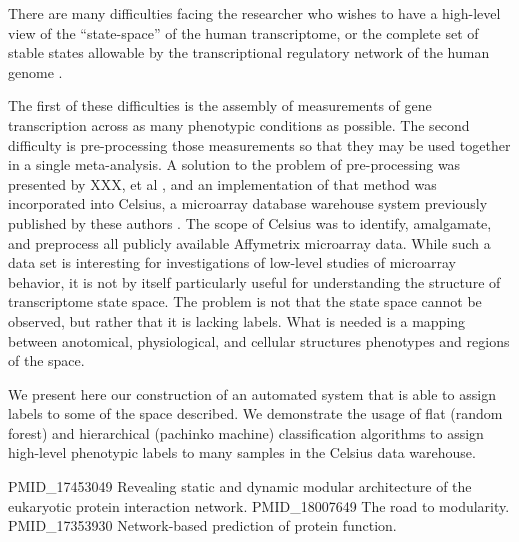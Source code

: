 There are many difficulties facing the researcher who wishes to have a
high-level view of the ``state-space'' of the human transcriptome, or the
complete set of stable states allowable by the transcriptional regulatory
network of the human genome \cite{XXX}.

The first of these difficulties is the assembly of measurements of gene
transcription across as many phenotypic conditions as possible.  The second
difficulty is pre-processing those measurements so that they may be used
together in a single meta-analysis.  A solution to the problem of
pre-processing was presented by XXX, et al \cite{genelogic}, and an
implementation of that method was incorporated into Celsius, a microarray
database warehouse system previously published by these authors \cite{celsius}.
The scope of Celsius was to identify, amalgamate, and preprocess all publicly
available Affymetrix microarray data.  While such a data set is interesting for
investigations of low-level studies of microarray behavior, it is not by itself
particularly useful for understanding the structure of transcriptome state
space.  The problem is not that the state space cannot be observed, but rather
that it is lacking labels.  What is needed is a mapping between anotomical,
physiological, and cellular structures phenotypes and regions of the space.

We present here our construction of an automated system that is able to assign
labels to some of the space described.  We demonstrate the usage of flat
(random forest) and hierarchical (pachinko machine) classification algorithms
to assign high-level phenotypic labels to many samples in the Celsius data
warehouse.


PMID_17453049	Revealing static and dynamic modular architecture of the eukaryotic protein interaction network.
PMID_18007649	The road to modularity.
PMID_17353930	Network-based prediction of protein function.
